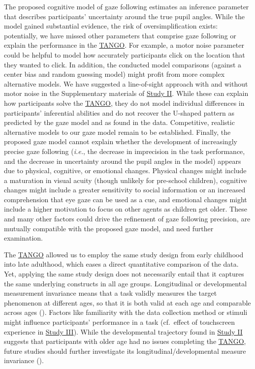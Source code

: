 \documentclass[
]{scrbook}
\begin{document}
The proposed cognitive model of gaze following estimates an inference parameter that describes participants' uncertainty around the true pupil angles. While the model gained substantial evidence, the risk of oversimplification exists: potentially, we have missed other parameters that comprise gaze following or explain the performance in the \hyperref[acronyms_TANGO]{TANGO}. For example, a motor noise parameter could be helpful to model how accurately participants click on the location that they wanted to click. In addition, the conducted model comparisons (against a center bias and random guessing model) might profit from more complex alternative models. We have suggested a line-of-sight approach with and without motor noise in the Supplementary materials of \hyperref[studyII]{Study II}. While these can explain how participants solve the \hyperref[acronyms_TANGO]{TANGO}, they do not model individual differences in participants' inferential abilities and do not recover the U-shaped pattern as predicted by the gaze model and as found in the data. Competitive, realistic alternative models to our gaze model remain to be established. Finally, the proposed gaze model cannot explain whether the development of increasingly precise gaze following (\emph{i.e.}, the decrease in imprecision in the task performance, and the decrease in uncertainty around the pupil angles in the model) appears due to physical, cognitive, or emotional changes. Physical changes might include a maturation in visual acuity (though unlikely for pre-school children), cognitive changes might include a greater sensitivity to social information or an increased comprehension that eye gaze can be used as a cue, and emotional changes might include a higher motivation to focus on other agents as children get older. These and many other factors could drive the refinement of gaze following precision, are mutually compatible with the proposed gaze model, and need further examination.

The \hyperref[acronyms_TANGO]{TANGO} allowed us to employ the same study design from early childhood into late adulthood, which eases a direct quantitative comparison of the data. Yet, applying the same study design does not necessarily entail that it captures the same underlying constructs in all age groups. Longitudinal or developmental measurement invariance means that a task validly measures the target phenomenon at different ages, so that it is both valid at each age and comparable across ages (). Factors like familiarity with the data collection method or stimuli might influence participants' performance in a task (cf.~effect of touchscreen experience in \hyperref[studyIII]{Study III}). While the developmental trajectory found in \hyperref[studyII]{Study II} suggests that participants with older age had no issues completing the \hyperref[acronyms_TANGO]{TANGO}, future studies should further investigate its longitudinal/developmental measure invariance ().
\end{document}
